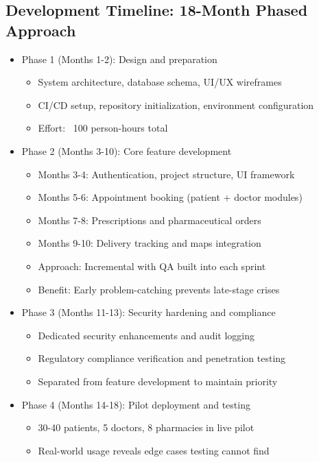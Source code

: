 \documentclass[12pt,a4paper]{report}
\begin{document}
\subsection{Development Timeline: 18-Month Phased Approach}

\begin{itemize}
  \item Phase 1 (Months 1-2): Design and preparation
    \begin{itemize}
      \item System architecture, database schema, UI/UX wireframes
      \item CI/CD setup, repository initialization, environment configuration
      \item Effort: ~100 person-hours total
    \end{itemize}
  \item Phase 2 (Months 3-10): Core feature development
    \begin{itemize}
      \item Months 3-4: Authentication, project structure, UI framework
      \item Months 5-6: Appointment booking (patient + doctor modules)
      \item Months 7-8: Prescriptions and pharmaceutical orders
      \item Months 9-10: Delivery tracking and maps integration
      \item Approach: Incremental with QA built into each sprint
      \item Benefit: Early problem-catching prevents late-stage crises
    \end{itemize}
  \item Phase 3 (Months 11-13): Security hardening and compliance
    \begin{itemize}
      \item Dedicated security enhancements and audit logging
      \item Regulatory compliance verification and penetration testing
      \item Separated from feature development to maintain priority
    \end{itemize}
  \item Phase 4 (Months 14-18): Pilot deployment and testing
    \begin{itemize}
      \item 30-40 patients, 5 doctors, 8 pharmacies in live pilot
      \item Real-world usage reveals edge cases testing cannot find

\end{itemize}
\end{itemize}
\end{document}
